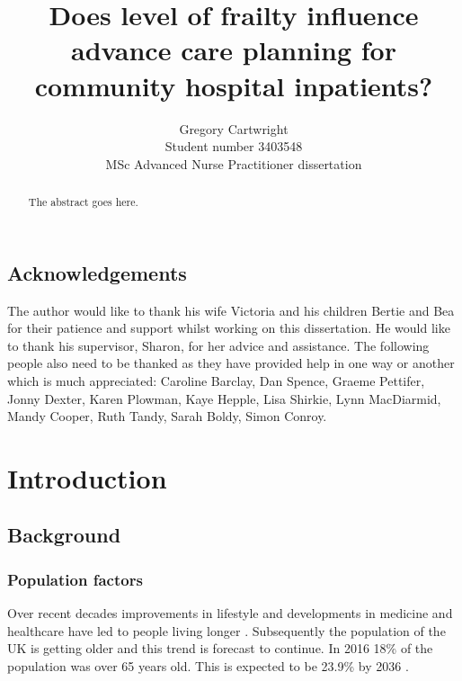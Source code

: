 \documentclass
[
	12pt,
	a4paper,
	oneside,
]{report}
\begin{document}
\author{Gregory Cartwright\\
	Student number 3403548\\
	MSc Advanced Nurse Practitioner dissertation
}
\title{Does level of frailty influence advance care planning 
	for community hospital inpatients?
}

\maketitle

\begin{abstract}
The abstract goes here.
\end{abstract}

\section*{Acknowledgements}
The author would like to thank his wife Victoria and his children Bertie and
Bea for their patience and support whilst working on this dissertation.
He would like to thank his supervisor, Sharon, for her advice and assistance.
The following people also need to be thanked as they have provided help in
one way or another which is much appreciated: 
Caroline Barclay,
Dan Spence,
Graeme Pettifer,
Jonny Dexter,
Karen Plowman,
Kaye Hepple,
Lisa Shirkie,
Lynn MacDiarmid,
Mandy Cooper,
Ruth Tandy,
Sarah Boldy,
Simon Conroy.

\tableofcontents 
\listoftables
\listoffigures

\chapter{Introduction}

\section{Background}

\subsection{Population factors}

Over recent decades 
improvements in lifestyle and developments in medicine and healthcare have led
to people living longer \parencite{nao:08,ons:17}. Subsequently the population 
of the UK is getting older and this trend is forecast to continue.
In 2016 18\% of the population was over 65 years old. This is expected to be
23.9\% by 2036 \parencite{ons:17}.
\end{document}
